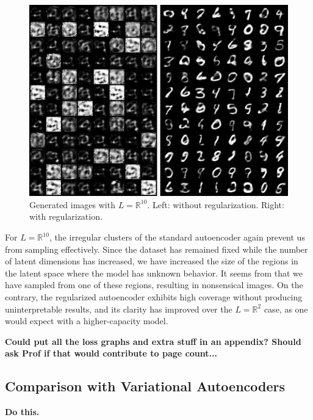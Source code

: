 \documentclass[conference]{IEEEtran}
\newcommand{\warn}[1]{\textbf{\color{red}#1}}
\newcommand{\R}{\mathbb{R}}
\begin{document}
\begin{figure}[H]
        \centering
        \includegraphics[scale=0.4]{fig/ae-10-comparison.png}
        \caption{Generated images with $L=\R^{10}$. Left: without regularization. Right: with regularization.}
	\label{ae-10-comparison}
\end{figure}

For $L=\R^{10}$, the irregular clusters of the standard autoencoder again prevent us from sampling effectively. Since the dataset has remained fixed while the number of latent dimensions has increased, we have increased the size of the regions in the latent space where the model has unknown behavior. It seems from  that we have sampled from one of these regions, resulting in nonsensical images. On the contrary, the regularized autoencoder exhibits high coverage without producing uninterpretable results, and its clarity has improved over the $L=\R^2$ case, as one would expect with a higher-capacity model.

\warn{Could put all the loss graphs and extra stuff in an appendix? Should ask Prof if that would contribute to page count...}

\subsection{Comparison with Variational Autoencoders}

\warn{Do this.}

\end{document}

